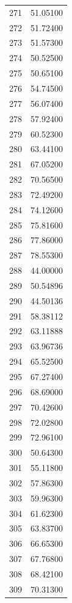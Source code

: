 \documentclass[
  letterpaper,
  DIV=11,
  numbers=noendperiod]{scrreprt}
\begin{document}
\begin{tcolorbox}
\begin{tabular}{lr}
271  &         51.05100 \\
272  &         51.72400 \\
273  &         51.57300 \\
274  &         50.52500 \\
275  &         50.65100 \\
276  &         54.74500 \\
277  &         56.07400 \\
278  &         57.92400 \\
279  &         60.52300 \\
280  &         63.44100 \\
281  &         67.05200 \\
282  &         70.56500 \\
283  &         72.49200 \\
284  &         74.12600 \\
285  &         75.81600 \\
286  &         77.86000 \\
287  &         78.55300 \\
288  &         44.00000 \\
289  &         50.54896 \\
290  &         44.50136 \\
291  &         58.38112 \\
292  &         63.11888 \\
293  &         63.96736 \\
294  &         65.52500 \\
295  &         67.27400 \\
296  &         68.69000 \\
297  &         70.42600 \\
298  &         72.02800 \\
299  &         72.96100 \\
300  &         50.64300 \\
301  &         55.11800 \\
302  &         57.86300 \\
303  &         59.96300 \\
304  &         61.62300 \\
305  &         63.83700 \\
306  &         66.65300 \\
307  &         67.76800 \\
308  &         68.42100 \\
309  &         70.31300 \\

\end{tabular}
\end{tcolorbox}
\end{document}
